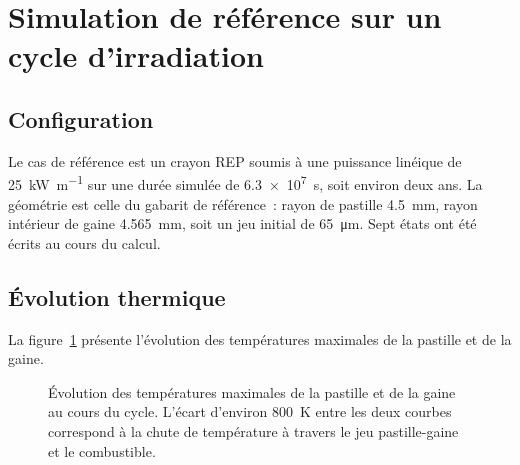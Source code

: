 \documentclass[12pt,a4paper,french]{report}
\begin{document}
\section{Simulation de référence sur un cycle d'irradiation}

\subsection{Configuration}

Le cas de référence est un crayon REP soumis à une puissance linéique de
\SI{25}{\kilo\watt\per\metre} sur une durée simulée de
\SI{6.3e7}{\second}, soit environ deux ans. La géométrie est celle du gabarit
de référence~: rayon de pastille \SI{4.5}{\milli\metre}, rayon intérieur de
gaine \SI{4.565}{\milli\metre}, soit un jeu initial de
\SI{65}{\micro\metre}. Sept états ont été écrits au cours du calcul.

\subsection{Évolution thermique}

La figure~\ref{fig:temp} présente l'évolution des températures maximales de la
pastille et de la gaine.

\begin{figure}[htbp]
\centering
{}
\caption[Températures maximales pastille et gaine]{Évolution des températures maximales de la pastille et de la gaine au
cours du cycle. L'écart d'environ \SI{800}{\kelvin} entre les deux courbes
correspond à la chute de température à travers le jeu pastille-gaine et le
combustible.}
\label{fig:temp}
\end{figure}
\end{document}
